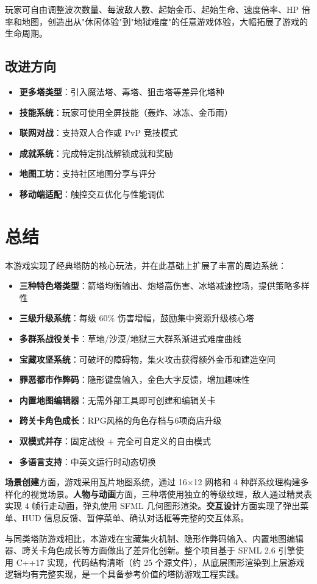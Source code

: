 \documentclass[12pt,a4paper]{ctexart}
\begin{document}
玩家可自由调整波次数量、每波敌人数、起始金币、起始生命、速度倍率、HP 倍率和地图，创造出从"休闲体验"到"地狱难度"的任意游戏体验，大幅拓展了游戏的生命周期。

\subsection{改进方向}

\begin{itemize}
    \item \textbf{更多塔类型}：引入魔法塔、毒塔、狙击塔等差异化塔种
    \item \textbf{技能系统}：玩家可使用全屏技能（轰炸、冰冻、金币雨）
    \item \textbf{联网对战}：支持双人合作或 PvP 竞技模式
    \item \textbf{成就系统}：完成特定挑战解锁成就和奖励
    \item \textbf{地图工坊}：支持社区地图分享与评分
    \item \textbf{移动端适配}：触控交互优化与性能调优
\end{itemize}


\section{总结}

本游戏实现了经典塔防的核心玩法，并在此基础上扩展了丰富的周边系统：

\begin{itemize}
    \item \textbf{三种特色塔类型}：箭塔均衡输出、炮塔高伤害、冰塔减速控场，提供策略多样性
    \item \textbf{三级升级系统}：每级 60\% 伤害增幅，鼓励集中资源升级核心塔
    \item \textbf{多群系战役关卡}：草地/沙漠/地狱三大群系渐进式难度曲线
    \item \textbf{宝藏攻坚系统}：可破坏的障碍物，集火攻击获得额外金币和建造空间
    \item \textbf{罪恶都市作弊码}：隐形键盘输入，金色大字反馈，增加趣味性
    \item \textbf{内置地图编辑器}：无需外部工具即可创建和编辑关卡
    \item \textbf{跨关卡角色成长}：RPG风格的角色存档与6项商店升级
    \item \textbf{双模式并存}：固定战役 + 完全可自定义的自由模式
    \item \textbf{多语言支持}：中英文运行时动态切换
\end{itemize}

\textbf{场景创建}方面，游戏采用瓦片地图系统，通过 16×12 网格和 4 种群系纹理构建多样化的视觉场景。\textbf{人物与动画}方面，三种塔使用独立的等级纹理，敌人通过精灵表实现 4 帧行走动画，弹丸使用 SFML 几何图形渲染。\textbf{交互设计}方面实现了弹出菜单、HUD 信息反馈、暂停菜单、确认对话框等完整的交互体系。

与同类塔防游戏相比，本游戏在宝藏集火机制、隐形作弊码输入、内置地图编辑器、跨关卡角色成长等方面做出了差异化创新。整个项目基于 SFML 2.6 引擎使用 C++17 实现，代码结构清晰（约 25 个源文件），从底层图形渲染到上层游戏逻辑均有完整实现，是一个具备参考价值的塔防游戏工程实践。
\end{document}
